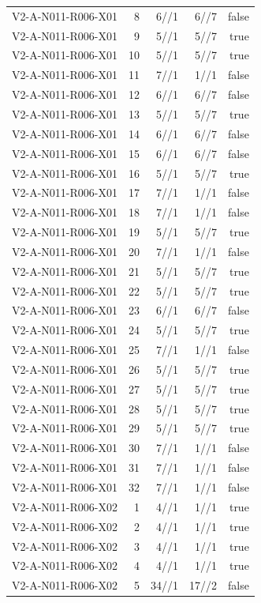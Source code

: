 {\begin{longtable}{lrrrr}
V2-A-N011-R006-X01 & 8 & 6//1 & 6//7 & false \\
V2-A-N011-R006-X01 & 9 & 5//1 & 5//7 & true \\
V2-A-N011-R006-X01 & 10 & 5//1 & 5//7 & true \\
V2-A-N011-R006-X01 & 11 & 7//1 & 1//1 & false \\
V2-A-N011-R006-X01 & 12 & 6//1 & 6//7 & false \\
V2-A-N011-R006-X01 & 13 & 5//1 & 5//7 & true \\
V2-A-N011-R006-X01 & 14 & 6//1 & 6//7 & false \\
V2-A-N011-R006-X01 & 15 & 6//1 & 6//7 & false \\
V2-A-N011-R006-X01 & 16 & 5//1 & 5//7 & true \\
V2-A-N011-R006-X01 & 17 & 7//1 & 1//1 & false \\
V2-A-N011-R006-X01 & 18 & 7//1 & 1//1 & false \\
V2-A-N011-R006-X01 & 19 & 5//1 & 5//7 & true \\
V2-A-N011-R006-X01 & 20 & 7//1 & 1//1 & false \\
V2-A-N011-R006-X01 & 21 & 5//1 & 5//7 & true \\
V2-A-N011-R006-X01 & 22 & 5//1 & 5//7 & true \\
V2-A-N011-R006-X01 & 23 & 6//1 & 6//7 & false \\
V2-A-N011-R006-X01 & 24 & 5//1 & 5//7 & true \\
V2-A-N011-R006-X01 & 25 & 7//1 & 1//1 & false \\
V2-A-N011-R006-X01 & 26 & 5//1 & 5//7 & true \\
V2-A-N011-R006-X01 & 27 & 5//1 & 5//7 & true \\
V2-A-N011-R006-X01 & 28 & 5//1 & 5//7 & true \\
V2-A-N011-R006-X01 & 29 & 5//1 & 5//7 & true \\
V2-A-N011-R006-X01 & 30 & 7//1 & 1//1 & false \\
V2-A-N011-R006-X01 & 31 & 7//1 & 1//1 & false \\
V2-A-N011-R006-X01 & 32 & 7//1 & 1//1 & false \\
V2-A-N011-R006-X02 & 1 & 4//1 & 1//1 & true \\
V2-A-N011-R006-X02 & 2 & 4//1 & 1//1 & true \\
V2-A-N011-R006-X02 & 3 & 4//1 & 1//1 & true \\
V2-A-N011-R006-X02 & 4 & 4//1 & 1//1 & true \\
V2-A-N011-R006-X02 & 5 & 34//1 & 17//2 & false \\

\end{longtable}}
